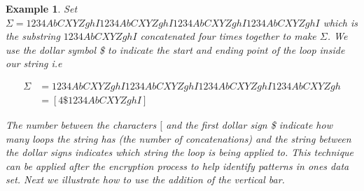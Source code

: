 \documentclass[amsmath,12pt,a4paper]{amsart}
\newtheorem{example}{Example}
\begin{document}
\begin{example}\label{Ex4}
Set $\Sigma = 1234AbCXYZghI1234AbCXYZghI1234AbCXYZghI1234AbCXYZghI$ which is the substring $1234AbCXYZghI$ concatenated four times together to make $\Sigma$. We use the dollar symbol \$ to indicate the start and ending point of the loop inside our string i.e 

\begin{equation}\label{Eq47}
\begin{split}
\Sigma & = 1234AbCXYZghI1234AbCXYZghI1234AbCXYZghI1234AbCXYZgh\\
& = [4\$1234AbCXYZghI]
\end{split}
\end{equation} 

The number between the characters $[$ and the first dollar sign \$ indicate how many loops the string has (the number of concatenations) and the string between the dollar signs indicates which string the loop is being applied to. This technique can be applied after the encryption process to help identify patterns in ones data set. Next we illustrate how to use the addition of the vertical bar. 
\end{example}
\end{document}
